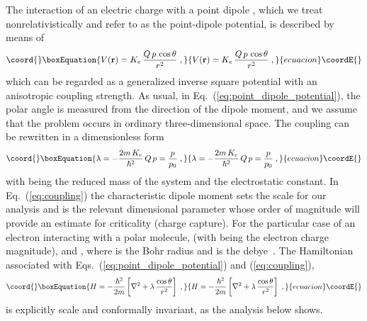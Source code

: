 \documentclass[a4paper,twocolumn,
showpacs,amssymb,aps,prl,superscriptaddress]{revtex4}%
\begin{document}
The interaction of an electric charge \coordHE{} with a point dipole
\coordHE{}, which we treat nonrelativistically and refer to as the
point-dipole potential, is described by means of
\begin{equation}\coord{}\boxEquation{
V({\bf r})= K_{e} \, \frac{ Q \, p \, \cos \theta}{r^{2}} 
\;  ,
\label{eq:point_dipole_potential}
}{
V({\bf r})= K_{e} \, \frac{ Q \, p \, \cos \theta}{r^{2}} 
\;  ,
}{ecuacion}\coordE{}\end{equation}
which can be regarded as a generalized inverse square potential
with an anisotropic coupling strength. As usual, in
Eq.~(\ref{eq:point_dipole_potential}), the polar angle \myHighlight{$\theta$}\coordHE{} is
measured from the direction of the dipole moment, and we assume
that the problem occurs in ordinary three-dimensional space. The
coupling can be rewritten in a  dimensionless form
\begin{equation}\coord{}\boxEquation{
\lambda = - \frac{2 m \, K_{e}}{\hbar^{2}}{ \,  Q \, p } =
\frac{p}{p_{0}} 
\; , 
\label{eq:coupling}
}{
\lambda = - \frac{2 m \, K_{e}}{\hbar^{2}}{ \,  Q \, p } =
\frac{p}{p_{0}} 
\; , 
}{ecuacion}\coordE{}\end{equation}
with \coordHE{} being the reduced mass of the system and \coordHE{} the
electrostatic constant. In Eq.~(\ref{eq:coupling}) the
characteristic dipole moment \coordHE{} sets the scale for our
analysis and is the relevant dimensional parameter whose order of
magnitude will provide an estimate for criticality (charge
capture). For the particular case of an electron interacting with
a polar molecule, \coordHE{} (with \coordHE{} being the electron charge magnitude), 
and \coordHE{}, 
where \coordHE{} is the Bohr radius and \coordHE{} is the
debye~\cite{debye}. The Hamiltonian associated with
Eqs.~(\ref{eq:point_dipole_potential}) and
(\ref{eq:coupling}),
\begin{equation}\coord{}\boxEquation{
H = - \frac{\hbar^{2}}{2m} \left[
 \nabla^{2}
+ \lambda \, \frac{\cos \theta}{r^{2}}
\right]
\; ,
\label{eq:Hamiltonian}
}{
H = - \frac{\hbar^{2}}{2m} \left[
 \nabla^{2}
+ \lambda \, \frac{\cos \theta}{r^{2}}
\right]
\; ,
}{ecuacion}\coordE{}\end{equation}
is explicitly scale and conformally invariant,
as the analysis below shows.
\end{document}
